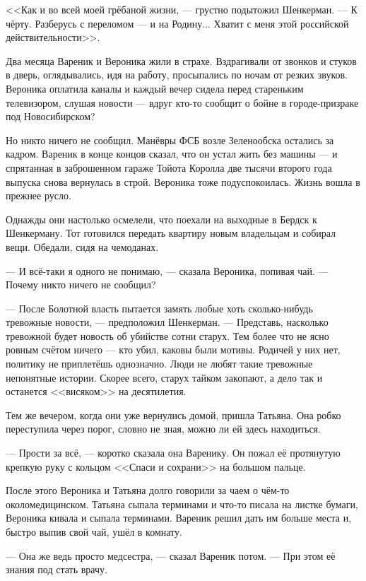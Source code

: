 <<Как и во всей моей грёбаной жизни, --- грустно подытожил Шенкерман.
--- К чёрту.
Разберусь с переломом --- и на Родину...
Хватит с меня этой российской действительности>>.

\asterism

Два месяца Вареник и Вероника жили в страхе.
Вздрагивали от звонков и стуков в дверь, оглядывались, идя на работу, просыпались по ночам от резких звуков.
Вероника оплатила каналы и каждый вечер сидела перед стареньким телевизором, слушая новости --- вдруг кто-то сообщит о бойне в городе-призраке под Новосибирском?

Но никто ничего не сообщил.
Манёвры ФСБ возле Зеленообска остались за кадром.
Вареник в конце концов сказал, что он устал жить без машины --- и спрятанная в заброшенном гараже Тойота Королла две тысячи второго года выпуска снова вернулась в строй.
Вероника тоже подуспокоилась.
Жизнь вошла в прежнее русло.

Однажды они настолько осмелели, что поехали на выходные в Бердск к Шенкерману.
Тот готовился передать квартиру новым владельцам и собирал вещи.
Обедали, сидя на чемоданах.

--- И всё-таки я одного не понимаю, --- сказала Вероника, попивая чай.
--- Почему никто ничего не сообщил?

--- После Болотной власть пытается замять любые хоть сколько-нибудь тревожные новости, --- предположил Шенкерман.
--- Представь, насколько тревожной будет новость об убийстве сотни старух.
Тем более что не ясно ровным счётом ничего --- кто убил, каковы были мотивы.
Родичей у них нет, политику не приплетёшь однозначно.
Люди не любят такие тревожные непонятные истории.
Скорее всего, старух тайком закопают, а дело так и останется <<висяком>> на десятилетия.

Тем же вечером, когда они уже вернулись домой, пришла Татьяна.
Она робко переступила через порог, словно не зная, можно ли ей здесь находиться.

--- Прости за всё, --- коротко сказала она Варенику.
Он пожал её протянутую крепкую руку с кольцом <<Спаси и сохрани>> на большом пальце.

После этого Вероника и Татьяна долго говорили за чаем о чём-то околомедицинском.
Татьяна сыпала терминами и что-то писала на листке бумаги, Вероника кивала и сыпала терминами.
Вареник решил дать им больше места и, быстро выпив свой чай, ушёл в комнату.

--- Она же ведь просто медсестра, --- сказал Вареник потом.
--- При этом её знания под стать врачу.

